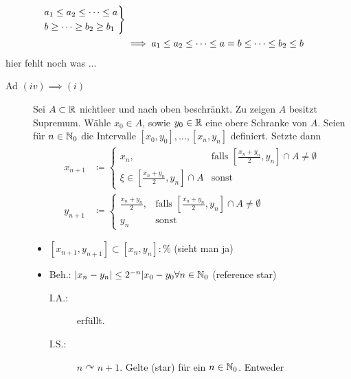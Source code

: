 \begin{subtheorem}
\begin{subproof*}
\begin{description}
\begin{align*}
					\begin{drcases}
						a_1 \leq a_2 \leq \dotsb \leq a\\
						b  \geq \dotsb \geq b_2 \geq b_1
					\end{drcases}\\
					&\implies a_1 \leq a_2 \leq \dotsb \leq a = b \leq \dotsb \leq b_2 \leq b
				\end{align*}
				hier fehlt noch was ...
		\end{description}
	\end{subproof*}
	\begin{subproof-headless}
		\begin{description}
			\item[Ad $(iv) \implies (i)$] Sei $ A \subset \mathbb{R} $ nichtleer und nach oben beschränkt. Zu zeigen $ A $ besitzt Supremum. Wähle $ x_0 \in A $, sowie $ y_0 \in \mathbb{R} $ eine obere Schranke von $ A $. Seien für $ n \in \mathbb{N}_0 $ die Intervalle $ [x_0, y_0], \dotsc, [x_n, y_n] $ definiert. Setzte dann
				\begin{align*}
					x_{n+1} &\coloneqq%
					\begin{cases}%
						x_n, & \text{falls } [\frac{x_n+y_n}{2}, y_n] \cap A \neq \emptyset\\
						\xi \in [\frac{x_n + y_n}{2}, y_n] \cap A & \text{sonst}
					\end{cases}\\
					y_{n+1} &\coloneqq%
					\begin{cases}%
						\frac{x_n + y_n}{2}, & \text{falls } [\frac{x_n+y_n}{2}, y_n] \cap A \neq \emptyset\\
						y_n & \text{sonst}
					\end{cases}%
				\end{align*}
				\begin{itemize}
					\item $[x_{n+1}, y_{n+1}] \subset [x_n, y_n] : \%$ (sieht man ja)
					\item Beh.: $ | x_n - y_n | \leq 2^{-n} | x_0 - y_0 \forall n \in \mathbb{N}_0 $ (reference star)
						\begin{description}
							\item[I.A.:] erfüllt.
							\item[I.S.:] $ n \curvearrowright n+1 $. Gelte (star) für ein $ n \in \mathbb{N}_0 $. Entweder
								\begin{enumerate}[label=(\alph*)]

\end{enumerate}
\end{description}
\end{itemize}
\end{description}
\end{subproof-headless}
\end{subtheorem}
